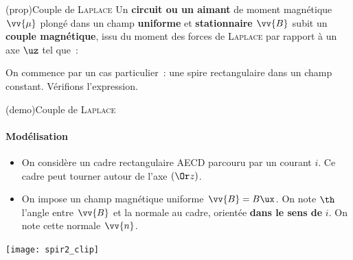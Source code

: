\documentclass[../../main/main.tex]{subfiles}
\begin{document}
\begin{tcb*}(prop){Couple de \textsc{Laplace}}
	Un \textbf{circuit ou un aimant} de moment magnétique $\vv{\mu}$ plongé dans
	un champ \textbf{uniforme} et \textbf{stationnaire} $\vv{B}$ subit un
	\textbf{couple magnétique}, issu du moment des forces de \textsc{Laplace} par
	rapport à un axe $\uz$ tel que~:
	\psw{%
		\[
			\boxed{\Gf_{\mathrm{Lap}} = \vv{\mu}\wedge \Bf}
		\]
	}%
	\vspace{-15pt}
\end{tcb*}
On commence par un cas particulier~: une spire rectangulaire dans un champ
constant. Vérifions l'expression.
\begin{tcb*}[breakable](demo){Couple de \textsc{Laplace}}
	\paragraph*{Modélisation}
	\begin{itemize}
		\item On considère un cadre rectangulaire AECD parcouru par un courant $i$. Ce
		      cadre peut tourner autour de l'axe $(\Or z)$.
		\item On impose un champ magnétique uniforme $\vv{B} = B\ux$. On note $\th$
		      l'angle entre $\vv{B}$ et la normale au cadre, orientée \textbf{dans le sens
			      de} $i$. On note cette normale $\vv{n}$.
	\end{itemize}
	\begin{isd}[lefthand ratio=.35]
		\begin{center}
			\texttt{[image: spir2\_clip]}
			\label{fig:spir1_a}
		\end{center}
		\tcblower
		\begin{center}
\end{center}
\end{isd}
\end{tcb*}
\end{document}
